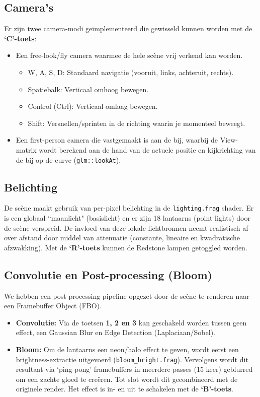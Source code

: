 \documentclass[11pt,a4paper]{article}
\begin{document}
\subsection{Camera's}
Er zijn twee camera-modi geïmplementeerd die gewisseld kunnen worden met de \textbf{`C'-toets}:
\begin{itemize}
    \item Een free-look/fly camera waarmee de hele scène vrij verkend kan worden.
        \begin{itemize}
            \item W, A, S, D: Standaard navigatie (vooruit, links, achteruit, rechts).
            \item Spatiebalk: Verticaal omhoog bewegen.
            \item Control (Ctrl): Verticaal omlaag bewegen.
            \item Shift: Versnellen/sprinten in de richting waarin je momenteel beweegt.
        \end{itemize}
    \item Een first-person camera die vastgemaakt is aan de bij, waarbij de View-matrix wordt berekend aan de hand van de actuele positie en kijkrichting van de bij op de curve (\texttt{glm::lookAt}).
\end{itemize}

\subsection{Belichting}
De scène maakt gebruik van per-pixel belichting in de \texttt{lighting.frag} shader. Er is een globaal ``maanlicht" (basislicht) en er zijn 18 lantaarns (point lights) door de scène verspreid. De invloed van deze lokale lichtbronnen neemt realistisch af over afstand door middel van attenuatie (constante, lineaire en kwadratische afzwakking). Met de \textbf{`R'-toets} kunnen de Redstone lampen getoggled worden.

\subsection{Convolutie en Post-processing (Bloom)}
We hebben een post-processing pipeline opgezet door de scène te renderen naar een Framebuffer Object (FBO). 
\begin{itemize}
    \item \textbf{Convolutie:} Via de toetsen \textbf{1, 2 en 3} kan geschakeld worden tussen geen effect, een Gaussian Blur en Edge Detection (Laplaciaan/Sobel).
    \item \textbf{Bloom:} Om de lantaarns een neon/halo effect te geven, wordt eerst een brightness-extractie uitgevoerd (\texttt{bloom\_bright.frag}). Vervolgens wordt dit resultaat via `ping-pong' framebuffers in meerdere passes (15 keer) geblurred om een zachte gloed te creëren. Tot slot wordt dit gecombineerd met de originele render. Het effect is in- en uit te schakelen met de \textbf{`B'-toets}.
\end{itemize}
\end{document}
